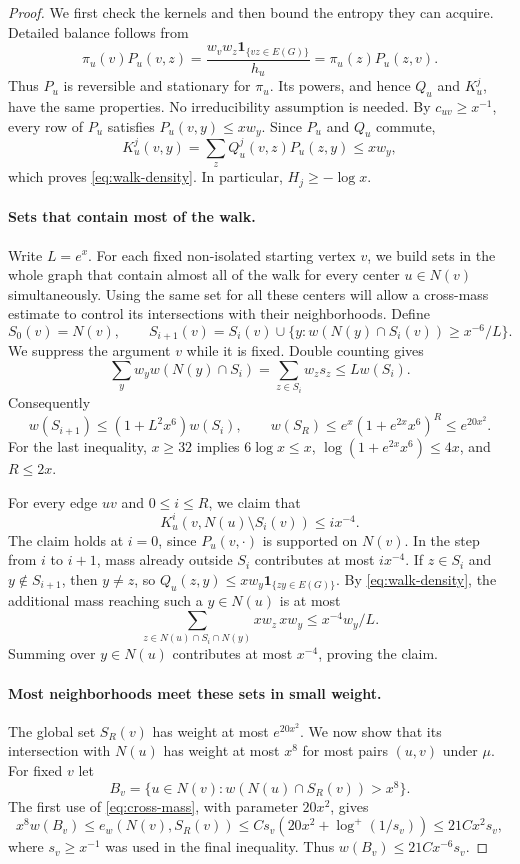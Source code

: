 \documentclass[11pt]{article}
\theoremstyle{definition}
\theoremstyle{remark}
\numberwithin{equation}{section}
\begin{document}
\begin{proof}
We first check the kernels and then bound the entropy they can acquire.
Detailed balance follows from
\[
 \pi_u(v)P_u(v,z)
 =\frac{w_vw_z\mathbf1_{\{vz\in E(G)\}}}{h_u}
 =\pi_u(z)P_u(z,v).
\]
Thus $P_u$ is reversible and stationary for $\pi_u$.  Its powers, and hence
$Q_u$ and $K_u^j$, have the same properties.  No irreducibility assumption
is needed.  By $c_{uv}\ge x^{-1}$, every row of $P_u$ satisfies
$P_u(v,y)\le xw_y$.  Since $P_u$ and $Q_u$ commute,
\[
 K_u^j(v,y)=\sum_zQ_u^j(v,z)P_u(z,y)\le xw_y,
\]
which proves \eqref{eq:walk-density}.  In particular, $H_j\ge-\log x$.

\paragraph{Sets that contain most of the walk.}
Write $L=e^x$.  For each fixed non-isolated starting vertex $v$, we build
sets in the whole graph that contain almost all of the walk for every
center $u\in N(v)$ simultaneously.  Using the same set for all these
centers will allow a cross-mass estimate to control its intersections
with their neighborhoods.  Define
\[
 S_0(v)=N(v),\qquad
 S_{i+1}(v)=S_i(v)\cup
 \{y:w(N(y)\cap S_i(v))\ge x^{-6}/L\}.
\]
We suppress the argument $v$ while it is fixed.  Double counting gives
\[
 \sum_yw_yw(N(y)\cap S_i)
 =\sum_{z\in S_i}w_zs_z\le Lw(S_i).
\]
Consequently
\[
 w(S_{i+1})\le(1+L^2x^6)w(S_i),\qquad
 w(S_R)\le e^x(1+e^{2x}x^6)^R\le e^{20x^2}.
\]
For the last inequality, $x\ge32$ implies $6\log x\le x$,
$\log(1+e^{2x}x^6)\le4x$, and $R\le2x$.

For every edge $uv$ and $0\le i\le R$, we claim that
\begin{equation}
 K_u^i(v,N(u)\setminus S_i(v))\le ix^{-4}.
 \label{eq:walk-leakage}
\end{equation}
The claim holds at $i=0$, since $P_u(v,\cdot)$ is supported on $N(v)$.
In the step from $i$ to $i+1$, mass already outside $S_i$ contributes at
most $ix^{-4}$.  If $z\in S_i$ and $y\notin S_{i+1}$, then $y\ne z$,
so $Q_u(z,y)\le xw_y\mathbf1_{\{zy\in E(G)\}}$.  By
\eqref{eq:walk-density}, the additional mass reaching such a $y\in N(u)$
is at most
\[
 \sum_{z\in N(u)\cap S_i\cap N(y)}xw_z\,xw_y
 \le x^{-4}w_y/L.
\]
Summing over $y\in N(u)$ contributes at most $x^{-4}$, proving the claim.

\paragraph{Most neighborhoods meet these sets in small weight.}
The global set $S_R(v)$ has weight at most $e^{20x^2}$.  We now show
that its intersection with $N(u)$ has weight at most $x^8$ for most
pairs $(u,v)$ under $\mu$.
For fixed $v$ let
\[
 B_v=\{u\in N(v):w(N(u)\cap S_R(v))>x^8\}.
\]
The first use of \eqref{eq:cross-mass}, with parameter $20x^2$,
gives
\[
 x^8w(B_v)\le e_w(N(v),S_R(v))
 \le Cs_v(20x^2+\log^+(1/s_v))
 \le21Cx^2s_v,
\]
where $s_v\ge x^{-1}$ was used in the final inequality.  Thus
$w(B_v)\le21Cx^{-6}s_v$.


\end{proof}
\end{document}
